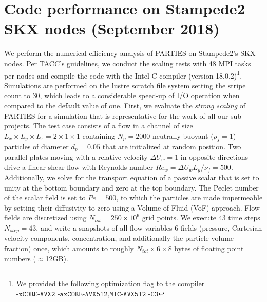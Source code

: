 \documentclass[10pt]{article}
\newcommand{\tk}{\textcolor{red}}
\begin{document}





\section{Code performance on Stampede2 SKX nodes (September 2018)}
\label{sec:skx}
We perform the numerical efficiency analysis of PARTIES on Stampede2's SKX nodes. Per TACC's guidelines, we conduct the scaling tests with 48 MPI tasks per nodes  and compile the code  with the Intel C compiler (version 18.0.2)\footnote{We provided the following optimization flag to the compiler $\texttt{-xCORE-AVX2 -axCORE-AVX512,MIC-AVX512 -O3}$}. Simulations are performed on the lustre scratch file system setting the stripe count to 30, which leads to a considerable speed-up of I/O operation when compared to the default value of one. First, we evaluate the \textit{strong scaling} of PARTIES for a simulation that is representative for the work of all our sub-projects. The test case consists of a flow in a channel of size $L_x \times L_y \times L_z = 2 \times 1 \times 1 $ containing $N_p=2000$ neutrally buoyant ($\rho_s = 1$) particles of diameter $d_p=0.05$ that are initialized at random position.  Two parallel plates moving with a relative velocity $\Delta U_w=1$ in opposite directions drive a linear shear flow with Reynolds number $Re_w = \Delta U_w L_y /\nu_f = 500$. Additionally, we solve for the transport equation of a passive scalar that is set to unity at the bottom boundary and zero at the top boundary. The Peclet number of the scalar field is set to $Pe=500$, to which the particles are made impermeable by setting their diffusivity to zero using a Volume of Fluid (VoF) approach. Flow fields are discretized using $N_\mathit{tot} = 250\times10^6$ grid points. We execute 43 time steps $N_{step}=43$, and write a snapshots of all flow variables 6 fields (pressure, Cartesian velocity components, concentration, and additionally the particle volume fraction) once, which amounts to roughly $N_{tot}\times 6\times 8$ bytes of floating point numbers ($\approx$12GB).\\
\end{document}
